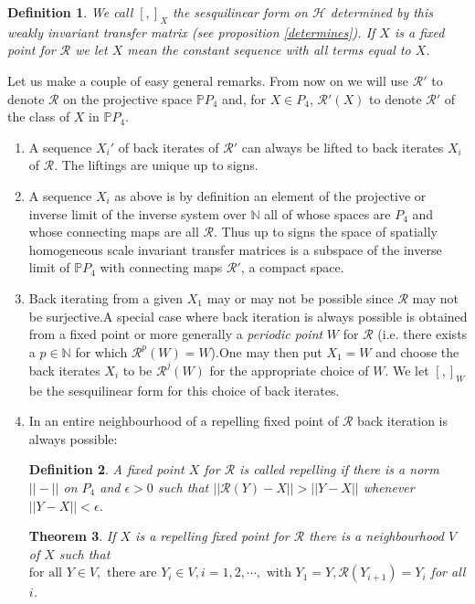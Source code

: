 \documentclass[11pt]{amsart}
\newtheorem{theorem}{Theorem}[section]
\newtheorem{definition}[theorem]{Definition}
\newcommand{\1}{\mathcal I}
\newcommand{\5}{\vskip 5pt}
\begin{document}
 \begin{definition} 
 We call $[,]_X$ the sesquilinear form on $\mathcal H$ determined by this weakly invariant transfer matrix (see 
 proposition \ref{determines}). If $X$ is a fixed point for $\mathcal R$ we let $X$ mean the constant sequence with all terms equal to $X$.
 \end{definition}
 Let us make a couple of easy general remarks. From now on we will use $\mathcal R'$ to denote $\mathcal R$ on the projective space
 $\mathbb P P_4$ and, for $X\in P_4$, $\mathcal R'(X)$ to denote $\mathcal R'$ of the class of $X$ in $\mathbb P P_4$. 
 \begin{enumerate}
 \item  A sequence $X_i'$ of 
 back iterates of $\mathcal R'$ can always be lifted to back iterates $X_i$ of $\mathcal R$. The liftings are unique up to signs.
 \item A sequence $X_i$ as above is by definition an element of the projective or inverse limit of the inverse system over $\mathbb N$
 all of whose spaces are $P_4$ and whose connecting maps are all $\mathcal R$. Thus up to signs the space of spatially homogeneous
 scale invariant transfer matrices is a subspace of the inverse limit of  $\mathbb P P_4$  with connecting maps $\mathcal R'$, a compact space.
 \item
 Back iterating from a given $X_1$ may or may not be possible since $\mathcal R$ may not be surjective.A special case where
 back iteration is always possible  is obtained from a fixed point or more generally a   \emph{periodic point} $W$ for $\mathcal R$ (i.e. there exists
 a $p\in \mathbb N$ for which $\mathcal R^p(W)=W$).One may then put $X_1=W$ and choose the back iterates  $X_i$
 to be $\mathcal R^j(W)$ for the appropriate choice of $W$. We let $[,]_W$ be the sesquilinear form for this choice of
 back iterates.
 
  \item In an entire  neighbourhood of a repelling fixed point of $\mathcal R$ back iteration is always possible:
 \begin{definition} A fixed point $X$ for $\mathcal R$ is called \emph{repelling} if there is a norm $||-||$ on $P_4$ and  $\epsilon>0$ 
 such that $||\mathcal R(Y)-X||> ||Y-X||$ whenever $||Y-X||<\epsilon$.
 \end{definition}
 \begin{theorem}\label{repelling} If $X$ is a repelling fixed point for $\mathcal R$ there is a neighbourhood $V$ of $X$ such that 
 $\mbox{for all  } Y \in V, \mbox{ there are }Y_i\in V, i=1,2,\cdots, \mbox{ with } Y_1=Y, \mathcal R(Y_{i+1})=Y_i$ for all $i$.
 

\end{theorem}
\end{enumerate}
\end{document}
